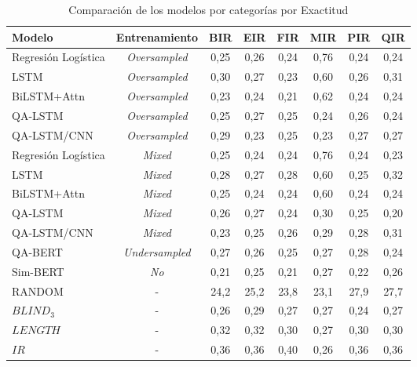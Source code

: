 \begin{table}[!tb]
  \begin{center}
    \caption{Comparación de los modelos por categorías por Exactitud}
    \begin{tabular}{l|c|c|c|c|c|c|c}
      \textbf{Modelo} & \textbf{Entrenamiento} & \textbf{BIR} & \textbf{EIR} & \textbf{FIR} & \textbf{MIR} & \textbf{PIR} & \textbf{QIR}\\
      \hline

      Regresión Logística & \textit{Oversampled} & 0,25 & 0,26 & 0,24 & 0,76 & 0,24 & 0,24 \\
      LSTM & \textit{Oversampled} & 0,30 & 0,27 & 0,23 & 0,60 & 0,26 & 0,31\\
      BiLSTM+Attn & \textit{Oversampled} & 0,23 & 0,24 & 0,21 & 0,62 & 0,24 & 0,24\\
      QA-LSTM & \textit{Oversampled} & 0,25 & 0,27 & 0,25 & 0,24 & 0,26 & 0,24\\
      QA-LSTM/CNN & \textit{Oversampled} & 0,29 & 0,23 & 0,25 & 0,23 & 0,27 & 0,27\\

      Regresión Logística & \textit{Mixed} & 0,25 & 0,24 & 0,24 & 0,76 & 0,24 & 0,23\\
      LSTM & \textit{Mixed} & 0,28 & 0,27 & 0,28 & 0,60 & 0,25 & 0,32\\
      BiLSTM+Attn & \textit{Mixed} & 0,25 & 0,24 & 0,24 & 0,60 & 0,24 & 0,24 \\
      QA-LSTM & \textit{Mixed} & 0,26 & 0,27 & 0,24 & 0,30 & 0,25 & 0,20 \\
      QA-LSTM/CNN & \textit{Mixed} & 0,23 & 0,25 & 0,26 & 0,29 & 0,28 & 0,31 \\

      QA-BERT & \textit{Undersampled} & 0,27 & 0,26 & 0,25 & 0,27 & 0,28 & 0,24\\
      Sim-BERT & \textit{No} & 0,21 & 0,25 & 0,21 & 0,27 & 0,22 & 0,26\\
      \hline
      RANDOM & - & 24,2 & 25,2 & 23,8 & 23,1 & 27,9 & 27,7 \\
      $BLIND_3$ & - & 0,26 & 0,29 & 0,27 & 0,27 & 0,24 & 0,27 \\
      $LENGTH$ & - & 0,32 & 0,32 & 0,30 & 0,27 & 0,30 & 0,30 \\
      $IR$ & - & 0,36 & 0,36 & 0,40 & 0,26 & 0,36 & 0,36 \\

    \end{tabular}
  \end{center}
  \label{comparison_accuracy}
\end{table}


